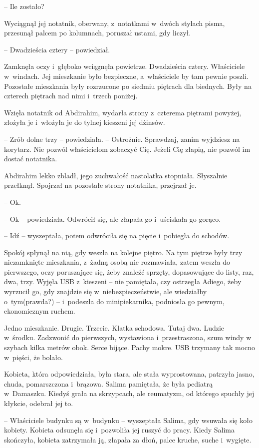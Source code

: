 \documentclass[oneside,polish,11pt,sfheadings]{mwbk}
\begin{document}
-- Ile zostało?

Wyciągnął jej notatnik, oberwany, z~notatkami w~dwóch stylach pisma,
przesunął palcem po kolumnach, poruszał ustami, gdy liczył.

-- Dwadzieścia cztery -- powiedział.

Zamknęła oczy i~głęboko wciągnęła powietrze. Dwadzieścia cztery.
Właściciele w~windach. Jej mieszkanie było bezpieczne, a~właściciele by
tam pewnie poszli. Pozostałe mieszkania były rozrzucone po siedmiu
piętrach dla biednych. Były na czterech piętrach nad nimi i~trzech
poniżej.

Wzięła notatnik od Abdirahim, wydarła strony z~czterema piętrami
powyżej, złożyła je i~włożyła je do tylnej kieszeni jej dżinsów. 

-- Zrób
dolne trzy -- powiedziała. -- Ostrożnie. Sprawdzaj, zanim wyjdziesz na
korytarz. Nie pozwól właścicielom zobaczyć Cię. Jeżeli Cię złapią, nie
pozwól im dostać notatnika.

Abdirahim lekko zbladł, jego zuchwałość nastolatka stopniała. Słyszalnie
przełknął. Spojrzał na pozostałe strony notatnika, przejrzał je. 

-- Ok.

-- Ok -- powiedziała. Odwrócił się, ale złapała go i~uściskała go gorąco.

-- Idź -- wyszeptała, potem odwróciła się na pięcie i~pobiegła do schodów.

Spokój spłynął na nią, gdy weszła na kolejne piętro. Na tym piętrze były
trzy niezamknięte mieszkania, z~żadną osobą nie rozmawiała, zatem weszła
do pierwszego, oczy poruszające się, żeby znaleźć sprzęty, dopasowujące
do listy, raz, dwa, trzy. Wyjęła USB z~kieszeni -- nie pamiętała, czy
ostrzegła Adiego, żeby wyrzucił go, gdy znajdzie się w~niebezpieczeństwie, ale wiedziałby o~tym(prawda?) -- i~podeszła do
minipiekarnika, podniosła go pewnym, ekonomicznym ruchem.

Jedno mieszkanie. Drugie. Trzecie. Klatka schodowa. Tutaj dwa. Ludzie w~środku. Zadzwonić do pierwszych, wystawiona i~przestraszona, szum windy
w szybach kilka metrów obok. Serce bijące. Pachy mokre. USB trzymany tak
mocno w~pięści, że bolało.

Kobieta, która odpowiedziała, była stara, ale stała wyprostowana,
patrzyła jasno, chuda, pomarszczona i~brązowa. Salima pamiętała, że była
pediatrą w~Damaszku. Kiedyś grała na skrzypcach, ale reumatyzm, od
którego spuchły jej kłykcie, odebrał jej to.

-- Właściciele budynku są w~budynku -- wyszeptała Salima, gdy wsuwała się
koło kobiety. Kobieta odsunęła się i~pozwoliła jej ruszyć do pracy.
Kiedy Salima skończyła, kobieta zatrzymała ją, złapała za dłoń, palce
kruche, suche i~wygięte.
\end{document}
